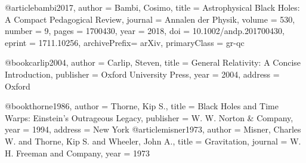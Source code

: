 @article{bambi2017,
  author       = {Bambi, Cosimo},
  title        = {Astrophysical Black Holes: A Compact Pedagogical Review},
  journal      = {Annalen der Physik},
  volume       = {530},
  number       = {9},
  pages        = {1700430},
  year         = {2018},
  doi          = {10.1002/andp.201700430},
  eprint       = {1711.10256},
  archivePrefix= {arXiv},
  primaryClass = {gr-qc}
}

@book{carlip2004,
  author    = {Carlip, Steven},
  title     = {General Relativity: A Concise Introduction},
  publisher = {Oxford University Press},
  year      = {2004},
  address   = {Oxford}
}

@book{thorne1986,
  author    = {Thorne, Kip S.},
  title     = {Black Holes and Time Warps: Einstein's Outrageous Legacy},
  publisher = {W. W. Norton \& Company},
  year      = {1994},
  address   = {New York}
}
@article{misner1973,
  author       = {Misner, Charles W. and Thorne, Kip S. and Wheeler, John A.},
  title        = {Gravitation},
  journal      = {W. H. Freeman and Company},
  year         = {1973}
}